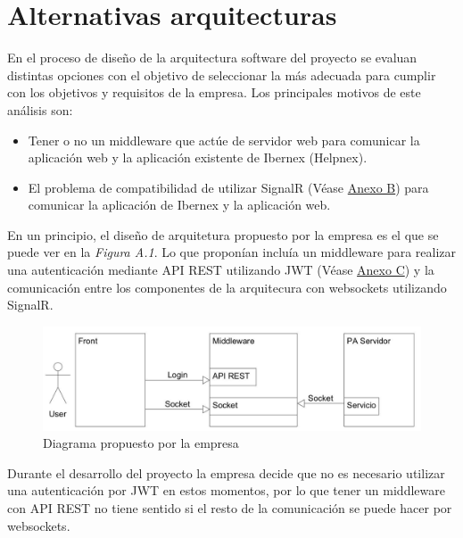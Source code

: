 \chapter{Alternativas arquitecturas}
\label{anexo-a}

En el proceso de diseño de la arquitectura software del proyecto se evaluan distintas opciones con el objetivo de seleccionar la más adecuada para cumplir con los objetivos y requisitos de la empresa. Los principales motivos de este análisis son:

\begin{itemize}
    \item Tener o no un middleware que actúe de servidor web para comunicar la aplicación web y la aplicación existente de Ibernex (Helpnex).
    \item El problema de compatibilidad de utilizar SignalR (Véase  \hyperref[anexo-b]{Anexo B}) para comunicar la aplicación de Ibernex y la aplicación web.
\end{itemize}

En un principio, el diseño de arquitetura propuesto por la empresa es el que se puede ver en la \textit{Figura A.1}. Lo que proponían incluía un middleware para realizar una autenticación mediante API REST utilizando JWT (Véase \hyperref[anexo-c]{Anexo C}) y la comunicación entre los componentes de la arquitecura con websockets utilizando SignalR.  

\begin{figure}[!h]
    \centering
    \includegraphics[width=15cm]{Imagenes/Descripcion-arquitectura}
    \caption{Diagrama propuesto por la empresa}
    \label{fig:descripcion-arquitectura}
\end{figure}

Durante el desarrollo del proyecto la empresa decide que no es necesario utilizar una autenticación por JWT en estos momentos, por lo que tener un middleware con API REST no tiene sentido si el resto de la comunicación se puede hacer por websockets.\\

